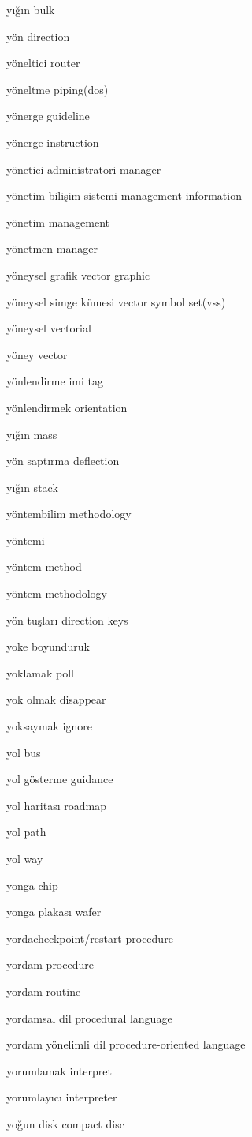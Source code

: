 \documentclass[12pt,fleqn]{article}\usepackage{../../common}
\begin{document}
yığın bulk

yön direction

yöneltici router

yöneltme piping(dos)

yönerge guideline

yönerge instruction

yönetici administratori manager

yönetim bilişim sistemi management information

yönetim management

yönetmen manager

yöneysel grafik vector graphic

yöneysel simge kümesi vector symbol set(vss)

yöneysel vectorial

yöney vector

yönlendirme imi tag

yönlendirmek orientation

yığın mass

yön saptırma deflection

yığın stack

yöntembilim methodology

yöntemi

yöntem method

yöntem methodology

yön tuşları direction keys

yoke boyunduruk

yoklamak poll

yok olmak disappear

yoksaymak ignore

yol bus

yol gösterme guidance

yol haritası roadmap

yol path

yol way

yonga chip

yonga plakası wafer

yordacheckpoint/restart procedure

yordam procedure

yordam routine

yordamsal dil procedural language

yordam yönelimli dil procedure-oriented language

yorumlamak interpret

yorumlayıcı interpreter

yoğun disk compact disc
\end{document}

